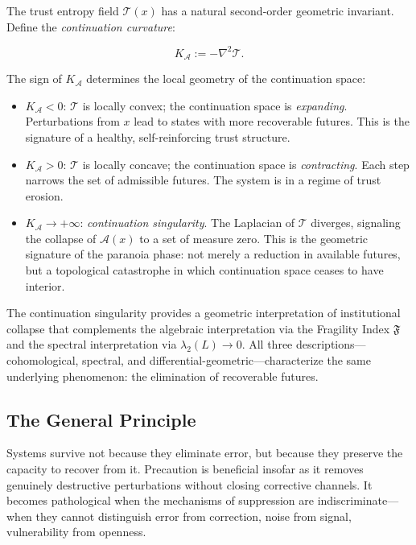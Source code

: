 \documentclass[11pt,a4paper]{article}
\theoremstyle{definition}
\theoremstyle{plain}
\begin{document}
The trust entropy field $\mathcal{T}(x)$ has a natural second-order geometric invariant. Define the \emph{continuation curvature}:

\begin{equation}
K_{\mathcal{A}} := -\nabla^2 \mathcal{T}.
\end{equation}

The sign of $K_{\mathcal{A}}$ determines the local geometry of the continuation space:

\begin{itemize}
\item $K_{\mathcal{A}} < 0$: $\mathcal{T}$ is locally convex; the continuation space is \emph{expanding}. Perturbations from $x$ lead to states with more recoverable futures. This is the signature of a healthy, self-reinforcing trust structure.
\item $K_{\mathcal{A}} > 0$: $\mathcal{T}$ is locally concave; the continuation space is \emph{contracting}. Each step narrows the set of admissible futures. The system is in a regime of trust erosion.
\item $K_{\mathcal{A}} \to +\infty$: \emph{continuation singularity}. The Laplacian of $\mathcal{T}$ diverges, signaling the collapse of $\mathcal{A}(x)$ to a set of measure zero. This is the geometric signature of the paranoia phase: not merely a reduction in available futures, but a topological catastrophe in which continuation space ceases to have interior.
\end{itemize}

The continuation singularity provides a geometric interpretation of institutional collapse that complements the algebraic interpretation via the Fragility Index $\mathfrak{F}$ and the spectral interpretation via $\lambda_2(L) \to 0$. All three descriptions---cohomological, spectral, and differential-geometric---characterize the same underlying phenomenon: the elimination of recoverable futures.

\subsection{The General Principle}

Systems survive not because they eliminate error, but because they preserve the capacity to recover from it. Precaution is beneficial insofar as it removes genuinely destructive perturbations without closing corrective channels. It becomes pathological when the mechanisms of suppression are indiscriminate---when they cannot distinguish error from correction, noise from signal, vulnerability from openness.
\end{document}
